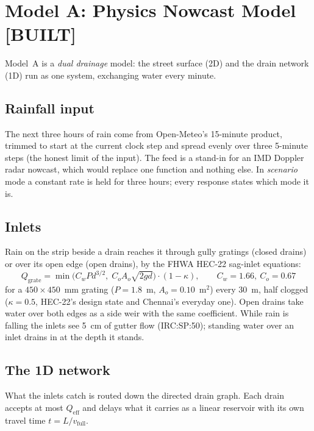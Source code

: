 \documentclass[11pt,a4paper]{article}
\newcommand{\built}{\textcolor{built}{\small\textbf{[BUILT]}}}
\begin{document}
\section{Model A: Physics Nowcast Model \built}

Model~A is a \emph{dual drainage} model: the street surface (2D) and the drain
network (1D) run as one system, exchanging water every minute.

\subsection{Rainfall input}
The next three hours of rain come from Open-Meteo's 15-minute product, trimmed to
start at the current clock step and spread evenly over three 5-minute steps (the
honest limit of the input). The feed is a stand-in for an IMD Doppler radar nowcast,
which would replace one function and nothing else. In \emph{scenario} mode a constant
rate is held for three hours; every response states which mode it is.

\subsection{Inlets}
Rain on the strip beside a drain reaches it through gully gratings (closed drains) or
over its open edge (open drains), by the FHWA HEC-22 sag-inlet equations:
\begin{equation}
  Q_{\text{grate}} = \min\!\Big( C_w P d^{3/2},\; C_o A_o \sqrt{2 g d} \Big)\cdot(1-\kappa),
  \qquad C_w = 1.66,\ C_o = 0.67
\end{equation}
for a $450\times450$~mm grating ($P = 1.8$~m, $A_o = 0.10$~m$^2$) every 30~m, half
clogged ($\kappa=0.5$, HEC-22's design state and Chennai's everyday one). Open drains
take water over both edges as a side weir with the same coefficient. While rain is
falling the inlets see 5~cm of gutter flow (IRC:SP:50); standing water over an inlet
drains in at the depth it stands.

\subsection{The 1D network}
What the inlets catch is routed down the directed drain graph. Each drain accepts at
most $Q_{\text{eff}}$ and delays what it carries as a linear reservoir with its own
travel time $t = L / v_{\text{full}}$.
\end{document}
